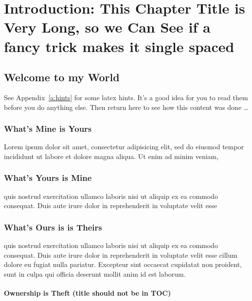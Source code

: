 \chapter[\label{c:intro}\protect\vspace{-1.3ex}Introduction: This Chapter Title
is Very Long, so we Can See\\ if a fancy trick makes it single
spaced]{Introduction: This Chapter Title is Very Long, so we Can See if a fancy
trick makes it single spaced}

\section{Welcome to my World}

See Appendix~\ref{a:hints} for some latex hints.  It's a good idea for
you to read them before you do anything else.  Then return here to see
how this content was done \dots


\subsection{What's Mine is Yours}

Lorem ipsum dolor sit amet, consectetur adipisicing elit, sed do eiusmod tempor incididunt ut labore et dolore magna aliqua. Ut enim ad minim veniam,

\subsection{What's Yours is Mine}


quis nostrud exercitation ullamco laboris nisi ut aliquip ex ea commodo consequat. Duis aute irure dolor in reprehenderit in voluptate velit esse



\subsection{What's Ours is is Theirs}

quis nostrud exercitation ullamco laboris nisi ut aliquip ex ea commodo consequat. Duis aute irure dolor in reprehenderit in voluptate velit esse
cillum dolore eu fugiat nulla pariatur. Excepteur sint occaecat cupidatat non proident, sunt in culpa qui officia deserunt mollit anim id est
laborum.

\subsubsection{Ownership is Theft (title should not be in TOC)}

